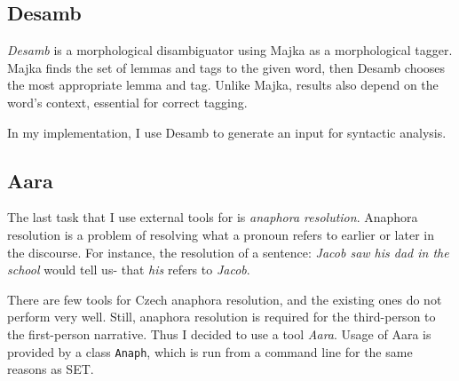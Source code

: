 \subsection{Desamb}

\emph{Desamb} is a morphological disambiguator using Majka as a morphological tagger. Majka finds the set of lemmas and tags to the given word, then Desamb chooses the most appropriate lemma and tag. Unlike Majka, results also depend on the word's context, essential for correct tagging.

In my implementation, I use Desamb to generate an input for syntactic analysis.

\subsection{Aara}

The last task that I use external tools for is \emph{anaphora resolution}. Anaphora resolution is a problem of resolving what a pronoun refers to earlier or later in the discourse. For instance, the resolution of a sentence: \emph{Jacob saw his dad in the school} would tell us- that \emph{his} refers to \emph{Jacob}.

There are few tools for Czech anaphora resolution, and the existing ones do not perform very well. Still, anaphora resolution is required for the third-person to the first-person narrative. Thus I decided to use a tool \emph{Aara}. Usage of Aara is provided by a class \texttt{Anaph}, which is run from a command line for the same reasons as SET.
